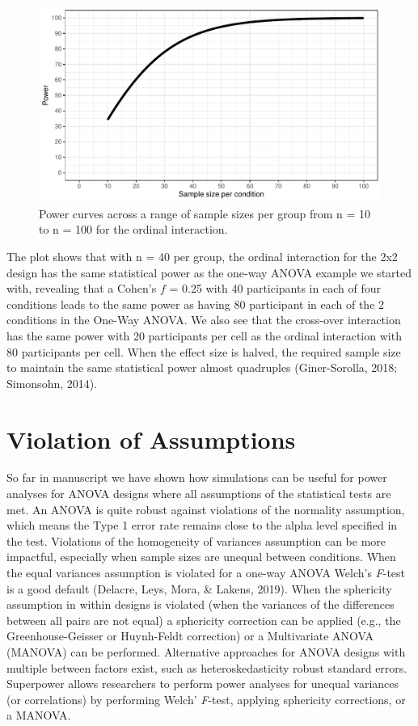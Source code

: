 \documentclass[
  ,jou,floatsintext]{apa6}
\begin{document}
\begin{figure}
\centering
\includegraphics{0.1_Simulation_Based_Power_Analysis_For_Factorial_ANOVA_Designs_files/figure-latex/power-plot-1.pdf}
\caption{\label{fig:power-plot}Power curves across a range of sample sizes per group from n = 10 to n = 100 for the ordinal interaction.}
\end{figure}

The plot shows that with n = 40 per group, the ordinal interaction for the 2x2 design has the same statistical power as the one-way ANOVA example we started with, revealing that a Cohen's \(f\) = 0.25 with 40 participants in each of four conditions leads to the same power as having 80 participant in each of the 2 conditions in the One-Way ANOVA.
We also see that the cross-over interaction has the same power with 20 participants per cell as the ordinal interaction with 80 participants per cell.
When the effect size is halved, the required sample size to maintain the same statistical power almost quadruples (Giner-Sorolla, 2018; Simonsohn, 2014).

\hypertarget{violation-of-assumptions}{%
\section{Violation of Assumptions}\label{violation-of-assumptions}}

So far in manuscript we have shown how simulations can be useful for power analyses for ANOVA designs where all assumptions of the statistical tests are met.
An ANOVA is quite robust against violations of the normality assumption, which means the Type 1 error rate remains close to the alpha level specified in the test. Violations of the homogeneity of variances assumption can be more impactful, especially when sample sizes are unequal between conditions.
When the equal variances assumption is violated for a one-way ANOVA Welch's \emph{F}-test is a good default (Delacre, Leys, Mora, \& Lakens, 2019).
When the sphericity assumption in within designs is violated (when the variances of the differences between all pairs are not equal) a sphericity correction can be applied (e.g., the Greenhouse-Geisser or Huynh-Feldt correction) or a Multivariate ANOVA (MANOVA) can be performed.
Alternative approaches for ANOVA designs with multiple between factors exist, such as heteroskedasticity robust standard errors.
Superpower allows researchers to perform power analyses for unequal variances (or correlations) by performing Welch' \emph{F}-test, applying sphericity corrections, or a MANOVA.
\end{document}
